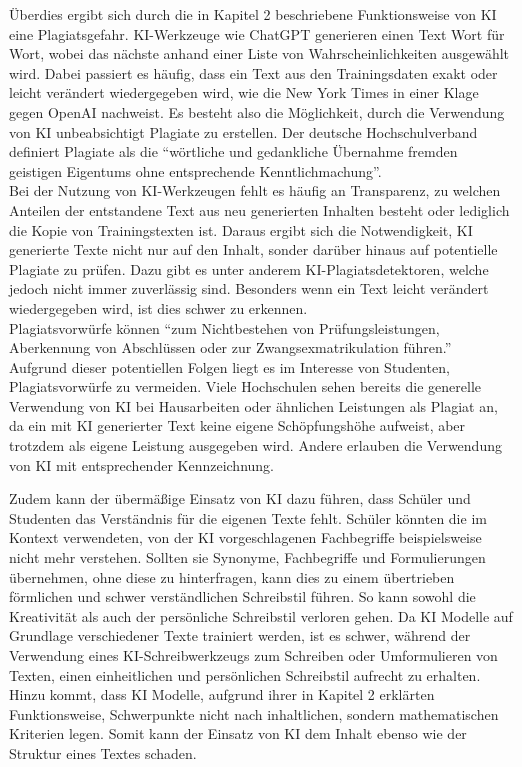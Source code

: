 \documentclass[../main.tex]{subfiles}
\begin{document}
Überdies ergibt sich durch die in Kapitel 2 beschriebene Funktionsweise von KI eine Plagiatsgefahr. KI-Werkzeuge wie ChatGPT generieren einen Text Wort für Wort, wobei das nächste anhand 
einer Liste von Wahrscheinlichkeiten ausgewählt wird. Dabei passiert es häufig, dass ein Text aus den Trainingsdaten exakt oder leicht verändert wiedergegeben wird, wie die New York Times in 
einer Klage gegen OpenAI nachweist\cite{NYTimes}. Es besteht also die Möglichkeit, durch die Verwendung von KI unbeabsichtigt Plagiate zu erstellen. Der deutsche Hochschulverband definiert Plagiate als 
die “wörtliche und gedankliche Übernahme fremden geistigen Eigentums ohne entsprechende Kenntlichmachung”.\cite{Hochschulverband} \\ Bei der Nutzung von KI-Werkzeugen fehlt es häufig an Transparenz, 
zu welchen Anteilen der entstandene Text aus neu generierten Inhalten besteht oder lediglich die Kopie von Trainingstexten ist. Daraus ergibt sich die Notwendigkeit, KI generierte Texte nicht nur 
auf den Inhalt, sonder darüber hinaus auf potentielle Plagiate zu prüfen. Dazu gibt es unter anderem KI-Plagiatsdetektoren, welche jedoch nicht immer zuverlässig sind. Besonders wenn ein Text 
leicht verändert wiedergegeben wird, ist dies schwer zu erkennen.\\ Plagiatsvorwürfe können “zum Nichtbestehen von Prüfungsleistungen, Aberkennung von Abschlüssen  oder  zur  Zwangsexmatrikulation  
führen.”\cite{Plagiate} Aufgrund dieser potentiellen Folgen liegt es im Interesse von Studenten, Plagiatsvorwürfe zu vermeiden. Viele Hochschulen sehen bereits die generelle Verwendung von KI bei Hausarbeiten 
oder ähnlichen Leistungen als Plagiat an, da ein mit KI generierter Text keine eigene Schöpfungshöhe aufweist, aber trotzdem als eigene Leistung ausgegeben wird. Andere erlauben die Verwendung von 
KI mit entsprechender Kennzeichnung.\cite{Plagiate}

Zudem kann der übermäßige Einsatz von KI dazu führen, dass Schüler und Studenten das Verständnis für die eigenen Texte fehlt. Schüler könnten die im 
Kontext verwendeten, von der KI vorgeschlagenen Fachbegriffe beispielsweise nicht mehr verstehen. Sollten sie Synonyme, Fachbegriffe und Formulierungen 
übernehmen, ohne diese zu hinterfragen, kann dies zu einem übertrieben förmlichen und schwer verständlichen Schreibstil führen\cite{teachers}. 
So kann sowohl die Kreativität als auch der persönliche Schreibstil verloren gehen. Da KI Modelle auf Grundlage verschiedener Texte trainiert werden, ist es
schwer, während der Verwendung eines KI-Schreibwerkzeugs zum Schreiben oder Umformulieren von Texten, einen einheitlichen und persönlichen Schreibstil aufrecht zu erhalten\cite{creativeWriting}. Hinzu kommt,
dass KI Modelle, aufgrund ihrer in Kapitel 2 erklärten Funktionsweise, Schwerpunkte nicht nach inhaltlichen, sondern mathematischen Kriterien legen\cite{berensBolk}. Somit kann der 
Einsatz von KI dem Inhalt ebenso wie der Struktur eines Textes schaden.\\
\end{document}
